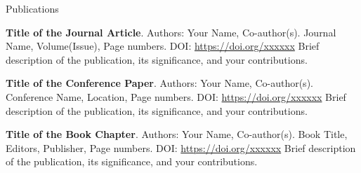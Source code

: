 \begin{rubric}{Publications}

\entry*[Year]%
    \textbf{Title of the Journal Article}.
    Authors: Your Name, Co-author(s).
    Journal Name, Volume(Issue), Page numbers.
    DOI: \url{https://doi.org/xxxxxx} 
    Brief description of the publication, its significance, and your contributions. \par

\entry*[Year]%
    \textbf{Title of the Conference Paper}. 
    Authors: Your Name, Co-author(s). 
    Conference Name, Location, Page numbers. 
    DOI: \url{https://doi.org/xxxxxx} 
    Brief description of the publication, its significance, and your contributions. \par

\entry*[Year]%
    \textbf{Title of the Book Chapter}. 
    Authors: Your Name, Co-author(s). 
    Book Title, Editors, Publisher, Page numbers. 
    DOI: \url{https://doi.org/xxxxxx} 
    Brief description of the publication, its significance, and your contributions. \par

\end{rubric}